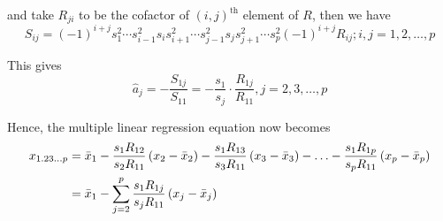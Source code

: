 \documentclass[10pt]{article}
\begin{document}
and take $ R_{ji} $ to be the cofactor of $ (i,j)^{\text{th}} $ element of $ R $, then we have
\begin{equation}
	S_{ij} = (-1)^{i+j} s_{1}^{2} \cdots s_{i-1}^{2}s_{i}s_{i+1}^{2} \cdots s_{j-1}^{2}s_{j}s_{j+1}^{2} \cdots s_{p}^{2} (-1)^{i+j} R_{ij}; i, j = 1, 2, \ldots, p
\end{equation}

This gives 
\begin{equation}
	\hat{a}_j = - \frac{ S_{1j} }{ S_{11} } = - \frac{ s_1 }{ s_j } \cdot \frac{ R_{1j} }{ R_{11} } , j = 2, 3, \ldots, p \label{coeff_eq}
\end{equation} 

Hence, the multiple linear regression equation now becomes 
\begin{align}
	x_{1.23\dots p} &= \bar{x}_1 - \frac{ s_1R_{12} }{ s_2R_{11} }\left( x_2 - \bar{x}_2 \right) - \frac{ s_1R_{13} }{ s_3R_{11} }\left( x_3 - \bar{x}_3 \right) - \ldots - \frac{ s_1R_{1p} }{ s_pR_{11} }\left( x_p - \bar{x}_p \right) \nonumber \\
			 &= \bar{x}_1 - \sum_{j=2}^{p} \frac{ s_1R_{1j} }{ s_jR_{11} }\left( x_j - \bar{x}_j \right) 
\end{align}
\end{document}
